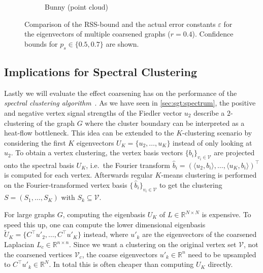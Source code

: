 \begin{figure}[ht]
\begin{subfigure}{0.33\textwidth}
		\caption{Bunny (point cloud)}\label{fig:cons:example:bunny}
	\end{subfigure}
	\caption{%
		Comparison of the RSS-bound and the actual error constants $\varepsilon$ for the eigenvectors of multiple coarsened graphs ($r = 0.4$).
		Confidence bounds for $p_s \in \{0.5, 0.7\}$ are shown.
	}\label{fig:cons:example}
\end{figure}

\subsection{Implications for Spectral Clustering}%
\label{sec:cons:sc}

Lastly we will evaluate the effect coarsening has on the performance of the \textit{spectral clustering algorithm}~\cite{Luxburg2007}.
As we have seen in \cref{sec:sgt:spectrum}, the positive and negative vertex signal strengths of the Fiedler vector $u_2$ describe a $2$-clustering of the graph $G$ where the cluster boundary can be interpreted as a heat-flow bottleneck.
This idea can be extended to the $K$-clustering scenario by considering the first $K$ eigenvectors $U_K = \{ u_2, \dots, u_K \}$ instead of only looking at $u_2$.
To obtain a vertex clustering, the vertex basis vectors ${\{ b_i \}}_{v_i \in \mathcal{V}}$ are projected onto the spectral basis $U_K$, i.e.\ the Fourier transform $\widehat{b}_i = {(\langle u_2, b_i \rangle, \dots, \langle u_K, b_i \rangle)}^\top$ is computed for each vertex.
Afterwards regular $K$-means clustering is performed on the Fourier-transformed vertex basis ${\{\,\widehat{b}_i \}}_{v_i \in \mathcal{V}}$ to get the clustering $S = (S_1, \dots, S_K)$ with $S_k \subseteq \mathcal{V}$.

For large graphs $G$, computing the eigenbasis $U_K$ of $L \in \mathbb{R}^{N \times N}$ is expensive.
To speed this up, one can compute the lower dimensional eigenbasis $\widetilde{U}_K = \{ C^\top u'_2, \dots, C^\top u'_K \}$ instead, where $u'_k$ are the eigenvectors of the coarsened Laplacian $L_c \in \mathbb{R}^{n \times n}$.
Since we want a clustering on the original vertex set $\mathcal{V}$, not the coarsened vertices $\mathcal{V}_c$, the coarse eigenvectors $u'_k \in \mathbb{R}^n$ need to be upsampled to $C^\top u'_k \in \mathbb{R}^N$.
In total this is often cheaper than computing $U_K$ directly.

